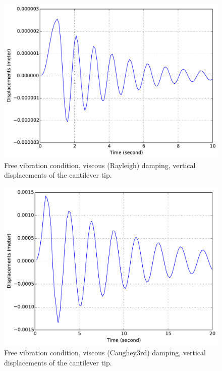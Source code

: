 \documentclass[fleqn,11pt]{article}
\begin{document}
\begin{figure}[!htb]
  \centering
  \includegraphics[width=12cm]{../Figure-files/_Chapter_Appendix_Illustrative_Examples/beam-1element-Rayleigh-damping.pdf}
  \caption{Free vibration condition, viscous (Rayleigh) damping, vertical displacements of the cantilever tip.}
  \label{fig_1beam_rayleigh}
\end{figure}

\begin{figure}[!htb]
  \centering
  \includegraphics[width=12cm]{../Figure-files/_Chapter_Appendix_Illustrative_Examples/beam-5element-Caughey3rd-damping.pdf}
  \caption{Free vibration condition, viscous (Caughey3rd) damping, vertical displacements of the cantilever tip.}
  \label{fig_1beam_Caughey3rd}
\end{figure}
\end{document}
